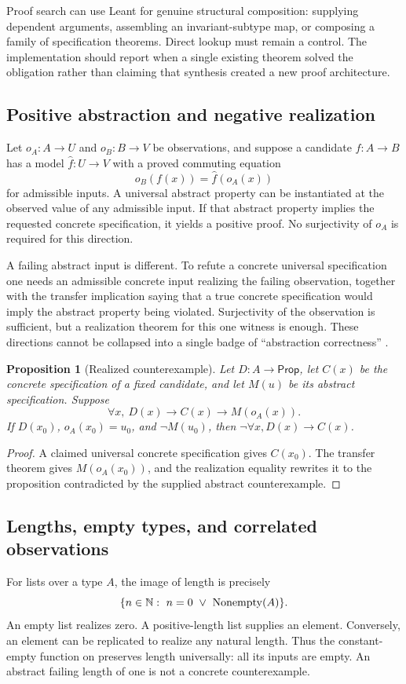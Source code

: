 \documentclass[11pt,a4paper]{article}
\newcommand{\code}[1]{\texttt{\detokenize{#1}}}
\newcommand{\Prop}{\ensuremath{\mathsf{Prop}}}\newcommand{\Req}{\mathsf{Req}}
\newtheorem{proposition}[theorem]{Proposition}
\theoremstyle{definition}\newtheorem{definition}[theorem]{Definition}
\theoremstyle{remark}\newtheorem{remark}[theorem]{Remark}
\begin{document}
Proof search can use Leant for genuine structural composition: supplying dependent arguments, assembling an invariant-subtype map, or composing a family of specification theorems. Direct lookup must remain a control. The implementation should report when a single existing theorem solved the obligation rather than claiming that synthesis created a new proof architecture.

\subsection{Positive abstraction and negative realization}
Let $o_A:A\to U$ and $o_B:B\to V$ be observations, and suppose a candidate $f:A\to B$ has a model $\widehat f:U\to V$ with a proved commuting equation
\[
 o_B(f(x))=\widehat f(o_A(x))
\]
for admissible inputs. A universal abstract property can be instantiated at the observed value of any admissible input. If that abstract property implies the requested concrete specification, it yields a positive proof. No surjectivity of $o_A$ is required for this direction.

A failing abstract input is different. To refute a concrete universal specification one needs an admissible concrete input realizing the failing observation, together with the transfer implication saying that a true concrete specification would imply the abstract property being violated. Surjectivity of the observation is sufficient, but a realization theorem for this one witness is enough. These directions cannot be collapsed into a single badge of ``abstraction correctness'' \cite{synA,synB}.

\begin{proposition}[Realized counterexample]
Let $D:A\to\Prop$, let $C(x)$ be the concrete specification of a fixed candidate, and let $M(u)$ be its abstract specification. Suppose
\[
 \forall x,\ D(x)\to C(x)\to M(o_A(x)).
\]
If $D(x_0)$, $o_A(x_0)=u_0$, and $\neg M(u_0)$, then
$\neg\forall x, D(x)\to C(x)$.
\end{proposition}
\begin{proof}
A claimed universal concrete specification gives $C(x_0)$. The transfer theorem gives $M(o_A(x_0))$, and the realization equality rewrites it to the proposition contradicted by the supplied abstract counterexample.
\end{proof}

\subsection{Lengths, empty types, and correlated observations}
For lists over a type $A$, the image of length is precisely
\[
 \{n\in\N:\ n=0\ \lor\ \operatorname{Nonempty}(A)\}.
\]
An empty list realizes zero. A positive-length list supplies an element. Conversely, an element can be replicated to realize any natural length. Thus the constant-empty function on \code{List Empty} preserves length universally: all its inputs are empty. An abstract failing length of one is not a concrete counterexample.
\end{document}
